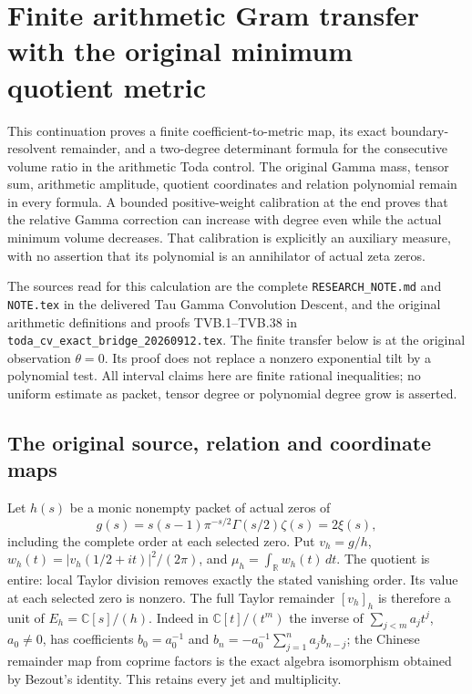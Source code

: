 \begingroup
\def\C{\mathbb C}
\def\R{\mathbb R}
\def\tr{\operatorname{Tr}}
\def\diag{\operatorname{diag}}
\section{Finite arithmetic Gram transfer with the original minimum quotient metric}



This continuation proves a finite coefficient-to-metric map, its exact
boundary-resolvent remainder, and a two-degree determinant formula for
the consecutive volume ratio in the arithmetic Toda control. The original
Gamma mass, tensor sum, arithmetic amplitude, quotient coordinates and
relation polynomial remain in every formula. A bounded positive-weight
calibration at the end proves that the relative Gamma correction can
increase with degree even while the actual minimum volume decreases.
That calibration is explicitly an auxiliary measure, with no assertion
that its polynomial is an annihilator of actual zeta zeros.

The sources read for this calculation are the complete
\texttt{RESEARCH\_NOTE.md} and \texttt{NOTE.tex} in the delivered
Tau Gamma Convolution Descent, and the original arithmetic definitions and proofs
TVB.1--TVB.38 in \texttt{toda\_cv\_exact\_bridge\_20260912.tex}.
The finite transfer below is at the original observation $\theta=0$.
Its proof does not replace a nonzero exponential tilt by a polynomial
test. All interval claims here are finite rational inequalities; no
uniform estimate as packet, tensor degree or polynomial degree grow is
asserted.

\subsection{The original source, relation and coordinate maps}

Let $h(s)$ be a monic nonempty packet of actual zeros of
\[
 g(s)=s(s-1)\pi^{-s/2}\Gamma(s/2)\zeta(s)=2\xi(s),
\]
including the complete order at each selected zero. Put $v_h=g/h$,
$w_h(t)=|v_h(1/2+it)|^2/(2\pi)$, and $\mu_h=\int_\R w_h(t)\,dt$.
The quotient is entire: local Taylor division removes exactly the stated
vanishing order. Its value at each selected zero is nonzero. The full
Taylor remainder $[v_h]_h$ is therefore a unit of $E_h=\C[s]/(h)$.
Indeed in $\C[t]/(t^m)$ the inverse of $\sum_{j<m}a_jt^j$, $a_0\ne0$,
has coefficients $b_0=a_0^{-1}$ and
$b_n=-a_0^{-1}\sum_{j=1}^n a_jb_{n-j}$; the Chinese remainder map
from coprime factors is the exact algebra isomorphism obtained by
Bezout's identity. This retains every jet and multiplicity.

